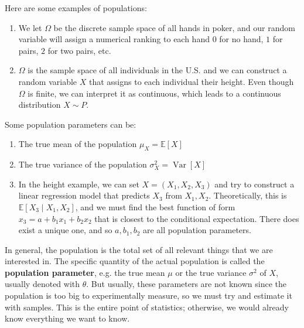 \documentclass{article}
\DeclareMathOperator{\Var}{Var}
\begin{document}
    \begin{example}[Populations]
      Here are some examples of populations: 
      \begin{enumerate}
        \item We let $\Omega$ be the discrete sample space of all hands in poker, and our random variable will assign a numerical ranking to each hand $0$ for no hand, $1$ for pairs, $2$ for two pairs, etc. 
        \item $\Omega$ is the sample space of all individuals in the U.S. and we can construct a random variable $X$ that assigns to each individual their height. Even though $\Omega$ is finite, we can interpret it as continuous, which leads to a continuous distribution $X \sim P$. 
      \end{enumerate}
    \end{example}

    \begin{example}[Parameters]
      Some population parameters can be: 
      \begin{enumerate}
        \item The true mean of the population $\mu_X = \mathbb{E} [X]$
        \item The true variance of the population $\sigma^2_X = \Var[X]$ 
        \item In the height example, we can set $X = (X_1, X_2, X_3)$ and try to construct a linear regression model that predicts $X_3$ from $X_1, X_2$. Theoretically, this is $\mathbb{E}[X_3 \mid X_1, X_2]$, and we must find the best function of form $x_3 = a + b_1 x_1 + b_2 x_2$ that is closest to the conditional expectation. There does exist a unique one, and so $a, b_1, b_2$ are all population parameters. 
      \end{enumerate}
    \end{example}

    In general, the population is the total set of all relevant things that we are interested in. The specific quantity of the actual population is called the \textbf{population parameter}, e.g. the true mean $\mu$ or the true variance $\sigma^2$ of $X$, usually denoted with $\theta$. But usually, these parameters are not known since the population is too big to experimentally measure, so we must try and estimate it with samples. This is the entire point of statistics; otherwise, we would already know everything we want to know. 
\end{document}
